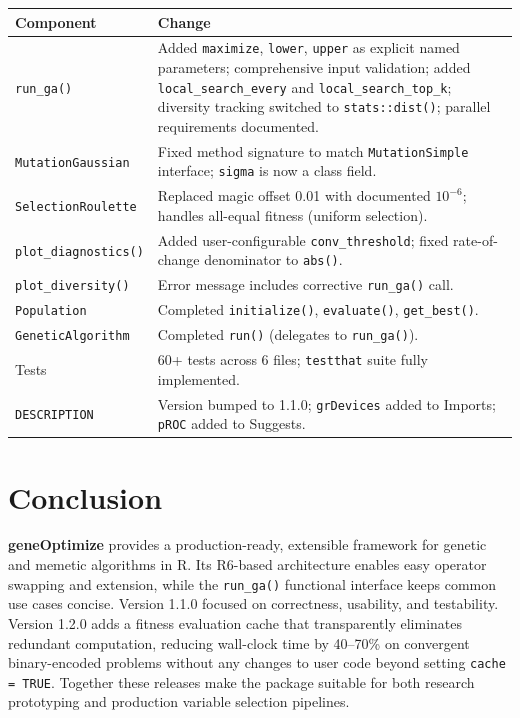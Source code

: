 \documentclass[11pt,a4paper]{article}
\begin{document}
\begin{center}
\begin{tabular}{p{3.5cm}p{9.5cm}}
  \toprule
  \textbf{Component} & \textbf{Change} \\
  \midrule
  \texttt{run\_ga()} &
    Added \texttt{maximize}, \texttt{lower}, \texttt{upper} as explicit
    named parameters; comprehensive input validation; added
    \texttt{local\_search\_every} and \texttt{local\_search\_top\_k};
    diversity tracking switched to \texttt{stats::dist()}; parallel
    requirements documented. \\[4pt]
  \texttt{MutationGaussian} &
    Fixed method signature to match \texttt{MutationSimple} interface;
    \texttt{sigma} is now a class field. \\[4pt]
  \texttt{SelectionRoulette} &
    Replaced magic offset 0.01 with documented $10^{-6}$; handles
    all-equal fitness (uniform selection). \\[4pt]
  \texttt{plot\_diagnostics()} &
    Added user-configurable \texttt{conv\_threshold}; fixed
    rate-of-change denominator to \texttt{abs()}. \\[4pt]
  \texttt{plot\_diversity()} &
    Error message includes corrective \texttt{run\_ga()} call. \\[4pt]
  \texttt{Population} &
    Completed \texttt{initialize()}, \texttt{evaluate()},
    \texttt{get\_best()}. \\[4pt]
  \texttt{GeneticAlgorithm} &
    Completed \texttt{run()} (delegates to \texttt{run\_ga()}). \\[4pt]
  Tests &
    60+ tests across 6 files; \texttt{testthat} suite fully implemented. \\[4pt]
  \texttt{DESCRIPTION} &
    Version bumped to 1.1.0; \texttt{grDevices} added to Imports;
    \texttt{pROC} added to Suggests. \\
  \bottomrule
\end{tabular}
\end{center}

\section{Conclusion}

\textbf{geneOptimize} provides a production-ready, extensible framework for
genetic and memetic algorithms in R. Its R6-based architecture enables easy
operator swapping and extension, while the \texttt{run\_ga()} functional
interface keeps common use cases concise. Version 1.1.0 focused on
correctness, usability, and testability. Version 1.2.0 adds a fitness
evaluation cache that transparently eliminates redundant computation, reducing
wall-clock time by 40--70\% on convergent binary-encoded problems without
any changes to user code beyond setting \texttt{cache = TRUE}. Together these
releases make the package suitable for both research prototyping and
production variable selection pipelines.
\end{document}
